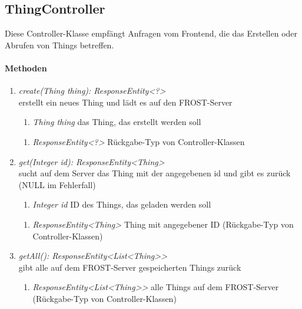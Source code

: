 \subsection*{ThingController}\label{thingCon}
Diese Controller-Klasse empfängt Anfragen vom Frontend, die das Erstellen oder Abrufen von Things betreffen.

\paragraph{Methoden}

\begin{enumerate}[+]
	\item \textit{ create(Thing thing): ResponseEntity<?> }\\
	erstellt ein neues Thing und lädt es auf den FROST-Server
	
	\begin{enumerate}[$\bullet$]
		\item \textit{Thing thing} das Thing, das erstellt werden soll
		
	\end{enumerate}
	\vspace{-0.2cm}
	\begin{enumerate}[$\circ$]
		\item \textit{ResponseEntity<?>} Rückgabe-Typ von Controller-Klassen
	\end{enumerate}
	
	\item \textit{ get(Integer id): ResponseEntity<Thing> }\\
	sucht auf dem Server das Thing mit der angegebenen id und gibt es zurück (NULL im Fehlerfall)
	
	\begin{enumerate}[$\bullet$]
		\item \textit{Integer id} ID des Things, das geladen werden soll
		
	\end{enumerate}
	\vspace{-0.2cm}
	\begin{enumerate}[$\circ$]
		\item \textit{ResponseEntity<Thing>} Thing mit angegebener ID (Rückgabe-Typ von Controller-Klassen)
	\end{enumerate}
	\item \textit{ getAll(): ResponseEntity<List<Thing>> }\\
	gibt alle auf dem FROST-Server gespeicherten Things zurück
	
	\begin{enumerate}[$\circ$]
		\item \textit{ResponseEntity<List<Thing>>} alle Things auf dem FROST-Server (Rückgabe-Typ von Controller-Klassen)
	\end{enumerate}
	
	
\end{enumerate}